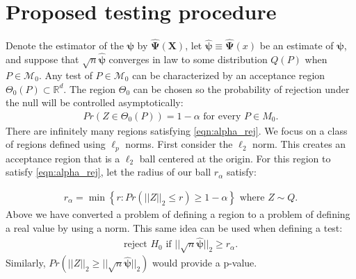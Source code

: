 \documentclass{article}
\newcommand{\rvo}{X}
\newcommand{\disto}{P}
\newcommand{\rvv}{Z}
\newcommand{\distv}{Q}
\begin{document}
\section{Proposed testing procedure}
\label{sec:prop_test_proc}
Denote the estimator of the $\boldsymbol{\psi}$ by $\hat{\boldsymbol{\Psi}}(\boldsymbol{\rvo})$, let $\hat{\boldsymbol{\psi}} \equiv \hat{\boldsymbol{\Psi}}(x)$ be an estimate of $\boldsymbol{\psi}$, and suppose that $\sqrt{n}\hat{\boldsymbol{\psi}}$ converges in law to some distribution $\distv(P)$ when $\disto \in \mathscr{M}_0$.  Any test of $\disto \in \mathscr{M}_0$ can be characterized by an acceptance region $\Theta_0(\disto) \subset \mathbb{R}^d$. The region $\Theta_0$ can be chosen so the probability of rejection under the null will be controlled asymptotically:
\begin{align}
  Pr(\rvv \in \Theta_0(P)) = 1 - \alpha \text{ for every } P \in M_0. \label{eqn:alpha_rej}
\end{align}
There are infinitely many regions satisfying \eqref{eqn:alpha_rej}.  We focus on a class of regions defined using $\ell_p$ norms. First consider the $\ell_2$ norm.  This creates an acceptance region that is a $\ell_2$ ball centered at the origin. For this region to satisfy \eqref{eqn:alpha_rej}, let the radius of our ball $r_\alpha$ satisfy: 

\begin{align*}
	r_\alpha = \min\left\{r : Pr(||\rvv||_2 \leq r) \geq 1 - \alpha \right\} \text{ where } \rvv \sim \distv.
\end{align*}
Above we have converted a problem of defining a region to a problem of defining a real value by using a norm.  This same idea can be used when defining a test:
\begin{align*}
	\text{reject } H_0 \text{ if } ||\sqrt{n} \hat{\boldsymbol{\psi}}||_2 \geq r_\alpha.
\end{align*}
Similarly, $Pr(||\rvv||_2 \geq ||\sqrt{n} \hat{\boldsymbol{\psi}}||_2)$ would provide a p-value.


\end{document}
